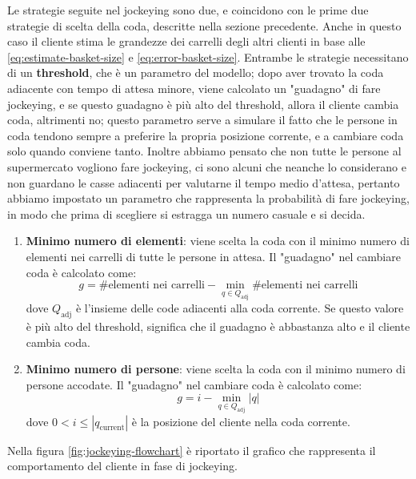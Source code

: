 Le strategie seguite nel jockeying sono due, e coincidono con le prime due strategie di scelta della coda, descritte nella sezione precedente. Anche in questo caso il cliente stima le grandezze dei carrelli degli altri clienti in base alle \ref{eq:estimate-basket-size} e \ref{eq:error-basket-size}.
Entrambe le strategie necessitano di un \textbf{threshold}, che è un parametro del modello; dopo aver trovato la coda adiacente con tempo di attesa minore, viene calcolato un "guadagno" di fare jockeying, e se questo guadagno è più alto del threshold, allora il cliente cambia coda, altrimenti no; questo parametro serve a simulare il fatto che le persone in coda tendono sempre a preferire la propria posizione corrente, e a cambiare coda solo quando conviene tanto. 
Inoltre abbiamo pensato che non tutte le persone al supermercato vogliono fare jockeying, ci sono alcuni che neanche lo considerano e non guardano le casse adiacenti per valutarne il tempo medio d'attesa, pertanto abbiamo impostato un parametro che rappresenta la probabilità di fare jockeying, in modo che prima di scegliere si estragga un numero casuale e si decida.

\begin{enumerate}
\item \textbf{Minimo numero di elementi}: viene scelta la coda con il minimo numero di elementi nei carrelli di tutte le persone in attesa. Il "guadagno" nel cambiare coda è calcolato come:
\begin{equation}
	g = \# \text{elementi nei carrelli} - \min\limits_{q \in Q_{\text{adj}}} \# \text{elementi nei carrelli}
\end{equation}
dove $Q_{\text{adj}}$ è l'insieme delle code adiacenti alla coda corrente. Se questo valore è più alto del threshold, significa che il guadagno è abbastanza alto e il cliente cambia coda.
\item \textbf{Minimo numero di persone}: viene scelta la coda con il minimo numero di persone accodate. Il "guadagno" nel cambiare coda è calcolato come:
\begin{equation}
	g = i - \min\limits_{q \in Q_{\text{adj}}} |q|
\end{equation}
dove $0 < i \le |q_{\text{current}}|$ è la posizione del cliente nella coda corrente.
\end{enumerate}

Nella figura \ref{fig:jockeying-flowchart} è riportato il grafico che rappresenta il comportamento del cliente in fase di jockeying.

